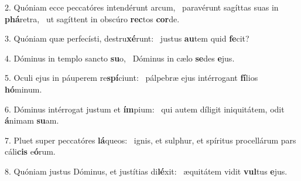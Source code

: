 2. Quóniam ecce peccatóres intendérunt arcum, \dag\  paravérunt sagíttas suas in \textbf{phá}retra, \ast\  ut sagíttent in obscúro \textbf{rec}tos \textbf{cor}de.\

3. Quóniam quæ perfecísti, destru\textbf{xé}runt: \ast\  justus \textbf{au}tem quid \textbf{fe}cit?\

4. Dóminus in templo sancto \textbf{su}o, \ast\  Dóminus in cælo \textbf{se}des \textbf{e}jus.\

5. Oculi ejus in páuperem re\textbf{spí}ciunt: \ast\  pálpebræ ejus intérrogant \textbf{fí}lios \textbf{hó}minum.\

6. Dóminus intérrogat justum et \textbf{ím}pium: \ast\  qui autem díligit iniquitátem, odit \textbf{á}nimam \textbf{su}am.\

7. Pluet super peccatóres \textbf{lá}queos: \ast\  ignis, et sulphur, et spíritus procellárum pars cáli\textbf{cis} e\textbf{ó}rum.\

8. Quóniam justus Dóminus, et justítias di\textbf{lé}xit: \ast\  æquitátem vidit \textbf{vul}tus \textbf{e}jus.\

